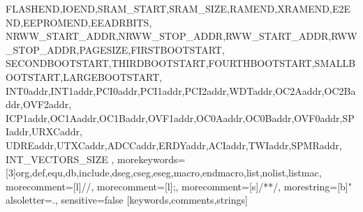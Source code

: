 {{				FLASHEND,IOEND,SRAM_START,SRAM_SIZE,RAMEND,XRAMEND,E2END,EEPROMEND,EEADRBITS,
				NRWW_START_ADDR,NRWW_STOP_ADDR,RWW_START_ADDR,RWW_STOP_ADDR,PAGESIZE,FIRSTBOOTSTART,
    			SECONDBOOTSTART,THIRDBOOTSTART,FOURTHBOOTSTART,SMALLBOOTSTART,LARGEBOOTSTART,
				INT0addr,INT1addr,PCI0addr,PCI1addr,PCI2addr,WDTaddr,OC2Aaddr,OC2Baddr,OVF2addr,
				ICP1addr,OC1Aaddr,OC1Baddr,OVF1addr,OC0Aaddr,OC0Baddr,OVF0addr,SPIaddr,URXCaddr,
				UDREaddr,UTXCaddr,ADCCaddr,ERDYaddr,ACIaddr,TWIaddr,SPMRaddr,
				INT_VECTORS_SIZE
},%
 morekeywords=[3]{org,def,equ,db,include,dseg,cseg,eseg,macro,endmacro,list,nolist,listmac},%
    morecomment=[l]{//}, %
    morecomment=[l]{;}, %
    morecomment=[s]{/*}{*/}, %
    morestring=[b]" %
    alsoletter=., %
    sensitive=false %
}[keywords,comments,strings] %
